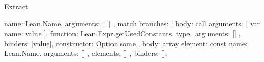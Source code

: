 \begin{lexlean}{Extract}
\begin{toolingmodule}
{{{{{{{{{{{{{{{{{{{{{{{{                                                                                  name: Lean.Name,
                                                                                  arguments: []
                                                                                }
                                                                              ]
                                                                            },
                                                                            match{
                                                                              branches: [
                                                                                {
                                                                                  body: call{
                                                                                    arguments: [
                                                                                      var{
                                                                                        name: value
                                                                                      }
                                                                                    ],
                                                                                    function: Lean.Expr.getUsedConstants,
                                                                                    type_arguments: []
                                                                                  },
                                                                                  binders: [value],
                                                                                  constructor: Option.some
                                                                                },
                                                                                {
                                                                                  body: array{
                                                                                    element: const{
                                                                                      name: Lean.Name,
                                                                                      arguments: []
                                                                                    },
                                                                                    elements: []
                                                                                  },
                                                                                  binders: [],
}}}}}}}}}}}}}}}}}}}}}}}}
\end{toolingmodule}
\end{lexlean}
